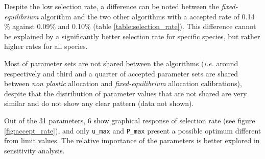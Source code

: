 
Despite the low selection rate, a difference can be noted between the \textit{fixed-equilibrium} algorithm and the two other algorithms with a accepted rate of 0.14 \% against 0.09\% and 0.10\% (table \ref{table:selection_rate}). This difference cannot be explained by a significantly better selection rate for specific species, but rather higher rates for all species.

Most of parameter sets are not shared between the algorithms (\textit{i.e.} around respectively and third and a quarter of accepted parameter sets are shared between \textit{non plastic} allocation and \textit{fixed-equilibrium} allocation calibrations), despite that the distribution of parameter values that are not shared are very similar and do not show any clear pattern (data not shown).

Out of the 31 parameters, 6 show graphical response of selection rate (see figure \ref{fig:accept_rate}), and only  \texttt{u\_max} and \texttt{P\_max} present a possible optimum different from limit values. The relative importance of the parameters is better explored in sensitivity analysis.







